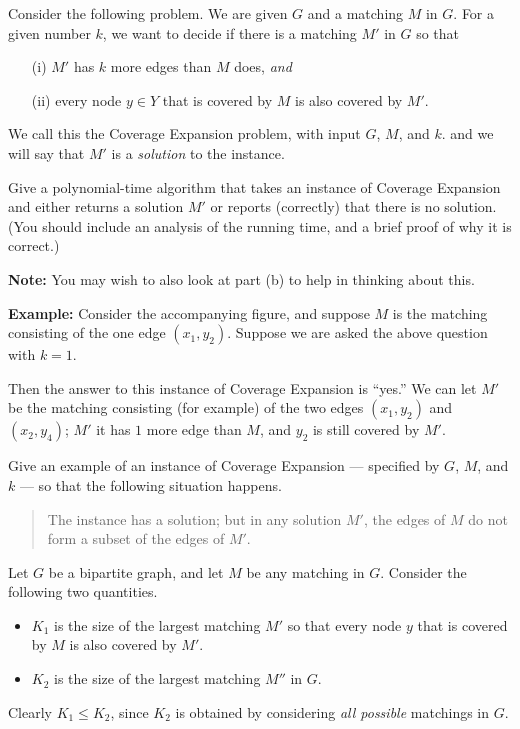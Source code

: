 \documentclass[12pt]{article}
\begin{document}
\begin{enumerate}
Consider the following problem.
We are given $G$ and a matching $M$ in $G$.
For a given number $k$, we want to decide if there
is a matching $M'$ in $G$ so that
\begin{itemize}
\item[(i)] $M'$ has $k$ more edges than $M$ does, {\em and}
\item[(ii)] every node $y \in Y$ that is covered
by $M$ is also covered by $M'$.
\end{itemize}
We call this the {\sc Coverage Expansion}
problem, with input $G$, $M$, and $k$.
and we will say that $M'$ is a {\em solution} to the instance.

Give a polynomial-time algorithm that takes an instance
of {\sc Coverage Expansion} and either returns a solution $M'$
or reports (correctly) that there is no solution.
(You should include an analysis of the running time,
and a brief proof of why it is correct.)

{\bf Note:} You may wish to also look at part (b)
to help in thinking about this.

\medskip
{\bf Example:} Consider the accompanying figure,
and suppose $M$ is the matching consisting of the
one edge $(x_1,y_2)$.
Suppose we are asked the above question with $k = 1$.

Then the answer to this instance
of {\sc Coverage Expansion} is ``yes.''
We can let $M'$ be the matching consisting (for example)
of the two edges $(x_1,y_2)$ and $(x_2,y_4)$;
$M'$ it has $1$ more edge than $M$, and
$y_2$ is still covered by $M'$.

Give an example of an instance of
{\sc Coverage Expansion} --- specified by $G$, $M$, and $k$ ---
so that the following situation happens.
\begin{quote}
The instance has a solution; but in any solution $M'$,
the edges of $M$ do not form a subset of the edges of $M'$.
\end{quote}

Let $G$ be a bipartite graph, and let $M$ be any matching in $G$.
Consider the following two quantities.
\begin{itemize}
\item $K_1$ is the size of the largest matching $M'$
so that every node $y$ that is covered by $M$ is also covered by $M'$.
\item $K_2$ is the size of the largest matching $M''$ in $G$.
\end{itemize}
Clearly $K_1 \leq K_2$, since $K_2$ is obtained by considering
{\em all possible} matchings in $G$.


\end{enumerate}
\end{document}
